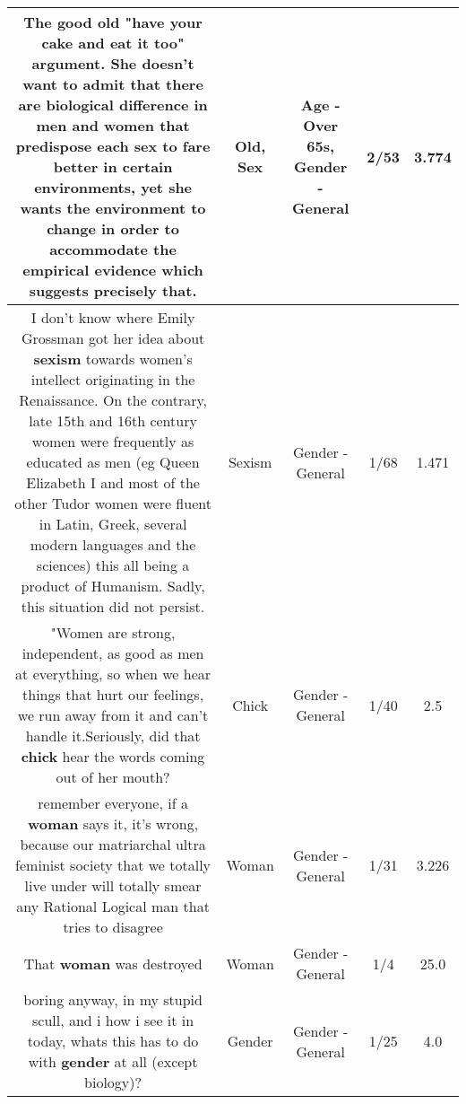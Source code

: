 \documentclass[11pt]{article}
\newlength\mylength
\begin{document}
\begin{center}
\begin{longtable}{|C{.65\mylength}|C{.30\mylength}|C{.12\mylength}|C{.12\mylength}|C{.12\mylength}|}
  \small The good \textbf{old} "have your cake and eat it too" argument. She doesn't want to admit that there are biological difference in men and women that predispose each \textbf{sex} to fare better in certain environments, yet she wants the environment to change in order to accommodate the empirical evidence which suggests precisely that.\normalsize   & Old, Sex & Age - Over 65s, Gender - General & 2/53 & 3.774 \\  \hline
  \small I don't know where Emily Grossman got her idea about \textbf{sexism} towards women's intellect originating in the Renaissance. On the contrary, late 15th and 16th century women were frequently as educated as men (eg Queen Elizabeth I and most of the other Tudor women were fluent in Latin, Greek, several modern languages and the sciences) this all being a product of Humanism. Sadly, this situation did not persist.\normalsize   & Sexism & Gender - General & 1/68 & 1.471 \\  \hline
  \small "Women are strong, independent, as good as men at everything, so when we hear things that hurt our feelings, we run away from it and can't handle it.Seriously, did that \textbf{chick} hear the words coming out of her mouth?\normalsize   & Chick & Gender - General & 1/40 & 2.5 \\  \hline
  \small remember everyone, if a \textbf{woman} says it, it's wrong, because our matriarchal ultra feminist society that we totally live under will totally smear any Rational Logical man that tries to disagree\normalsize   & Woman & Gender - General & 1/31 & 3.226 \\  \hline
  \small That \textbf{woman} was destroyed\normalsize   & Woman & Gender - General & 1/4 & 25.0 \\  \hline
  \small boring anyway, in my stupid scull, and i how i see it in today, whats this has to do with \textbf{gender} at all (except biology)?\normalsize   & Gender & Gender - General & 1/25 & 4.0 \\  \hline

\end{longtable}
\end{center}
\end{document}
